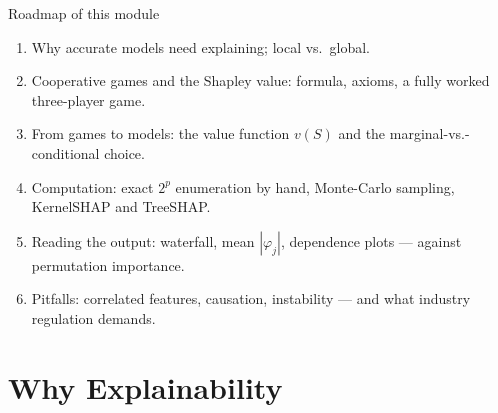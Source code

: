 \documentclass[aspectratio=169,11pt]{beamer}
\begin{document}
\begin{frame}{Roadmap of this module}
  \begin{takeaway}
    \begin{enumerate}
      \item Why accurate models need explaining; local vs.\ global.
      \item Cooperative games and the Shapley value: formula, axioms, a
            fully worked three-player game.
      \item From games to models: the value function $v(S)$ and the
            marginal-vs.-conditional choice.
      \item Computation: exact $2^p$ enumeration by hand, Monte-Carlo
            sampling, KernelSHAP and TreeSHAP.
      \item Reading the output: waterfall, mean $|\varphi_j|$, dependence
            plots --- against permutation importance.
      \item Pitfalls: correlated features, causation, instability ---
            and what industry regulation demands.
    \end{enumerate}
  \end{takeaway}
\end{frame}


\section{Why Explainability}
\end{document}
